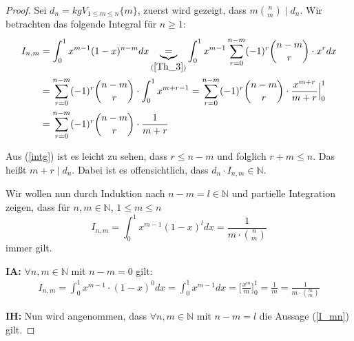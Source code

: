 \documentclass[12pt,oneside]{article}
\theoremstyle{remark}
\theoremstyle{definition}
\begin{document}
\begin{proof}
Sei $d_{n} = kgV_{1 \leq m \leq n}{\{m\}}$, zuerst wird  gezeigt, dass $m {n \choose m} \mid d_n$.\newline 
Wir betrachten das folgende Integral für $n \geq 1$:\newline
\begin{equation}\label{intg}
    \begin{split}
      \begin{aligned}
        I_{n,m}&= \int_{0}^{1} x^{m-1} (1-x)^{n - m} dx \underbrace{=}_{(\ref{Th_3})} \int_{0}^{1} x^{m-1} \sum_{r = 0}^{n - m} (-1)^r {n - m\choose r} \cdot x^r dx \\
        &= \sum_{r = 0}^{n - m}(-1)^r {n - m \choose r} \cdot \int_{0}^{1} x^{m + r - 1} 
        = \sum_{r = 0}^{n - m} (-1)^r {n - m \choose r} \cdot \frac{x^{m+r}}{m+r}\Big|_0^1\\
        &= \sum_{r = 0}^{n - m} (-1)^r {n - m \choose r} \cdot \frac{1}{m + r}
      \end{aligned}
    \end{split}
\end{equation}

Aus (\ref{intg}) ist es leicht zu sehen, dass $r \leq n - m $ und folglich $ r + m \leq n $. Das heißt $m + r \mid d_{n}$. Dabei ist es offensichtlich, dass $d_{n} \cdot I_{n,m} \in \mathbb{N}$.\newline\newline

Wir wollen nun durch Induktion nach $n - m = l \in \mathbb{N}$ und partielle Integration zeigen, dass für $n,m \in \mathbb{N}, \, 1 \leq  m \leq n$
\begin{equation}\label{I_mn}
    I_{n,m} = \int_{0}^{1} x^{m-1} (1-x)^{l} dx = \frac{1}{m \cdot {n \choose m}}
\end{equation}
immer gilt.\newline\newline


\textbf{IA:}
$\forall n,m \in \mathbb{N}$ mit $ n - m = 0$ gilt:
\begin{align*}
    I_{n,m} =  \int_{0}^{1} x^{m - 1 } \cdot (1-x)^{0} dx = \int_{0}^{1} x^{m - 1} dx = \Big[ \frac{x^m}{m}\Big]_0^1 = \frac{1}{m} = \frac{1}{m \cdot {m \choose m}}
\end{align*}

\textbf{IH:}
Nun wird angenommen, dass $\forall n,m \in \mathbb{N}$ mit $ n - m  = l$ die Aussage (\ref{I_mn}) gilt.\newline\newline


\end{proof}
\end{document}
